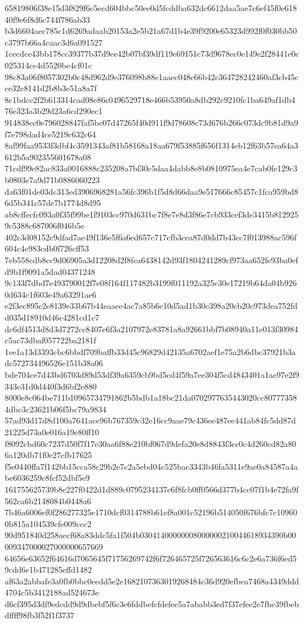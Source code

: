 {65819806f38e15d3f829f6c5ecd604bbc50ee0d5fcddba632dc6612daa5ae7c6ef45f0e61840f9e6f8d6c744f786ab33
b3d6604aec785c1d6269adaab20153a2e5b21a67d1b4e39f9200e65323d992f0f030bb50c3797b66a4caac3d6a091527
1cecdce43bb178cc39377b37d9ee42b07bf39df119e69151c73d9678ec0e149e2f28441e0c025314ce4d5520be4cf01c
98c83a06f8057302b0c48d962d9e376098b88e1aaec048c66b42c364728242460af3cb45cce32c8141d2b8b3e51a8a7f
8c1bdcc2f2b613314cad08e86c0496529718e466b53950a8db292c9210fc1ba649af1db476e323a3b29d23a6cd290ec1
914838ec0e796028847faf5bc07d47265f40d911f9d78608c73d676b266c073dc9b81d9a9f7e798dad4ce5219c632c64
8af99faa9533f3dbf4c3591343af81b58168a18aa679f53885f656f1314eb12f63b57ea64a3612b5a902355601678a08
71cdf99e82ac833a0016888c235208a7bf30c5daa4dabb8e8b0810975ea4e7cab0fe129c3b0803e7a9d71b0886060223
da63f01de03dc313ed3906968281a56fc396b1f5d8d66daa9e517666c85457c1fca959bd86d5b341c57de7b1774d8d95
ab8cffecfc093a0f35f99be1f9103cc970d631bc7f8e7e8d3f86e7cb933cef3de3415b8129259c5388c687006f046b5e
402c3d08152c9dfad7ae49f136e5f6a6ed657c717cfb3cea87d0dd7b43cc7f013988ac596f604c4e983cdb0f726cff53
7eb558cdb8cc9d06905a3d12208d2f8fca6438142d93f1804241289cf973aa652fe93ba0efd9b1f9091a5dad04371248
9c133f7dbd7e493790012f7e08f164f117482b3199f011192a325c30e17219b64da04b9260d634c1f603e49a63291ae6
e2f3ec895c2e8139e33b67b44eaaee4ac7a85b6c10d5ad1b30c398a20cb20c973dea752fdd035d18910d46c4281cd1c7
dc6df4513d8d3d7272cc8407e6f3a2107972e83781a8a92661bbf7b08940a11e013f30984c5ac73dbaf057722ba2181f
1ee1a13d3393cbc6bbdf709baffb33d45c96829d42135a6702aef1e75a2b6dbc37921b3adc572734496526e151b38a06
bde704ce7d43bd6703d89d53df39a6359cb9bd5cd4f59a7ee304f5cd4843401a1ae97e2f9343e31d0d440f3d6bf2e880
8000e8c064be711b10965734791862b5bdb1a18bc21da0702977635443020cc807773584dbc3c23621b06f5bc79a9834
57ad93d17d8d100a7641ace96b767359c32e16cc9aae79c436ee487ee441ab84fc5dd87d21225d73a0e016a19e80ff10
f8092cbd60c7237d50f7f17e30aa6f88e210bf067d9defa20e8d8843f3cc0c4d260cd82a806a120db71f0e27cfb17625
f5e0440ffa7f142bb15cca58c29b2e7c2a5ebd04c525bac3343b46fa5311e9ae0a84587a4abe6036259c8fcf52dbf5e9
161755625739b8e227f0422d1d889c0795234137e6f8fcb0ff0566d377b4cc07f1b4e72fa9f562ca6b2148084b0448a6
7b46a6006ef0f286277325e1710dcf0314788b61ef8a001c52196b514050f676bfc7c109600b815a104539cfe009ccc2
90d951840d258aecf68a83ddc5fa1f504b03041400000008000000210044618934390b00009347000027000000657669
64656e63652f64616d7065645f71756269742f6f726465725f726563616c6c2e6a736f6ed59cdd6e1b471285effd1482
af63a2abbafe3a0fb0bbc0eedd5e2e1682107363019268484c36d920efbea7468a4349ddd4704c5b3412188ad524673e
d6cf395d3df9edcdd9d9dbebf5f6c3e6fddbefcfdefee5a7ababb3ed7f37efee2e7fbc39fbebdffff98fb3f52f1f3737
}
